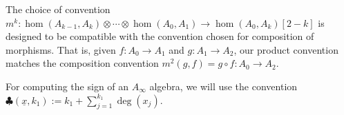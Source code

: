 
The choice of convention $m^k:\hom(A_{k-1}, A_k)\otimes \cdots \otimes \hom(A_0, A_1)\to \hom(A_0, A_k)[2-k]$ is designed to be compatible with the convention chosen for composition of morphisms. That is, given $f: A_0\to A_1$ and $g:A_1\to A_2$, our product convention matches the composition convention  $m^2(g, f)= g\circ f: A_0\to A_2$.

For computing the sign of an $A_\infty$ algebra, we will use the convention $\clubsuit(\underline x,k_1):= k_1+\sum_{j=1}^{k_1} \deg(x_j)$.